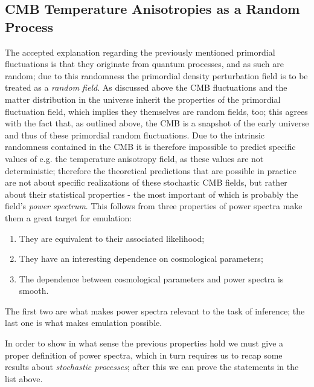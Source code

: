 \subsection{CMB Temperature Anisotropies as a Random Process}\label{subsec:cmb_random_process}
The accepted explanation regarding the previously mentioned primordial fluctuations is that they originate from quantum processes, and as such are random; due to this randomness the primordial density perturbation field is to be treated as a \emph{random field}. As discussed above the CMB fluctuations and the matter distribution in the universe inherit the properties of the primordial fluctuation field, which implies they themselves are random fields, too; this agrees with the fact that, as outlined above, the CMB is a snapshot of the early universe and thus of these primordial random fluctuations. Due to the intrinsic randomness contained in the CMB it is therefore impossible to predict specific values of e.g. the temperature anisotropy field, as these values are not deterministic; therefore the theoretical predictions that are possible in practice are not about specific realizations of these stochastic CMB fields, but rather about their statistical properties - the most important of which is probably the field's \emph{power spectrum}. 
This follows from three properties of power spectra make them a great target for emulation:
\begin{enumerate}
    \item They are equivalent to their associated likelihood;
    \item They have an interesting dependence on cosmological parameters;
    \item The dependence between cosmological parameters and power spectra is smooth.
\end{enumerate}
The first two are what makes power spectra relevant to the task of inference; the last one is what makes emulation possible.

In order to show in what sense the previous properties hold we must give a proper definition of power spectra, which in turn requires us to recap some results about \emph{stochastic processes}; after this we can prove the statements in the list above.

